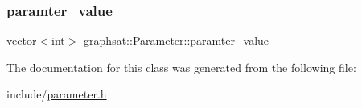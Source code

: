 \subsubsection{\texorpdfstring{paramter\_value}{paramter\_value}}
{\footnotesize\ttfamily vector$<$int$>$ graphsat\+::\+Parameter\+::paramter\+\_\+value\hspace{0.3cm}{\ttfamily [private]}}



The documentation for this class was generated from the following file\+:\begin{DoxyCompactItemize}
\item 
include/\mbox{\hyperlink{parameter_8h}{parameter.\+h}}\end{DoxyCompactItemize}
